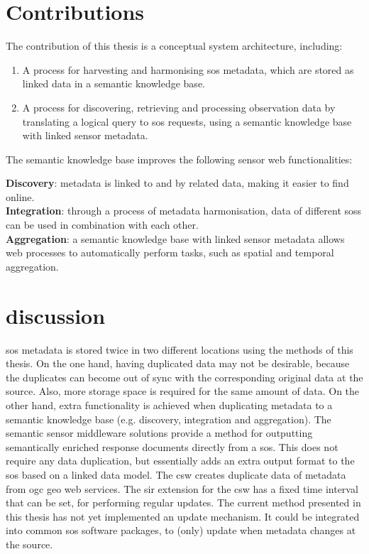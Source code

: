 \section{Contributions}
\label{contributions}

The contribution of this thesis is a conceptual system architecture, including:
\begin{enumerate}
	\item A process for harvesting and harmonising \ac{sos} metadata, which are stored as linked data in a semantic knowledge base.
	\item A process for discovering, retrieving and processing observation data by translating a logical query to \ac{sos} requests, using a semantic knowledge base with linked sensor metadata. 
\end{enumerate}

The semantic knowledge base improves the following sensor web functionalities:\\
\begin{addmargin}[0.5cm]{0cm}
	\textbf{Discovery}: metadata is linked to and by related data, making it easier to find online.\\
	\textbf{Integration}: through a process of metadata harmonisation, data of different \aclp{sos} can be used in combination with each other.  \\
	\textbf{Aggregation}: a semantic knowledge base with linked sensor metadata allows web processes to automatically perform tasks, such as spatial and temporal aggregation. 
\end{addmargin}


\section{discussion}

\ac{sos} metadata is stored twice in two different locations using the methods of this thesis. On the one hand, having duplicated data may not be desirable, because the duplicates can become out of sync with the corresponding original data at the source. Also, more storage space is required for the same amount of data. On the other hand, extra functionality is achieved when duplicating metadata to a semantic knowledge base (e.g. discovery, integration and aggregation). The semantic sensor middleware solutions provide a method for outputting semantically enriched response documents directly from a \ac{sos}. This does not require any data duplication, but essentially adds an extra output format to the \ac{sos} based on a linked data model. The \ac{csw} creates duplicate data of metadata from \ac{ogc} geo web services. The \acs{sir} extension for the \ac{csw} has a fixed time interval that can be set, for performing regular updates. The current method presented in this thesis has not yet implemented an update mechanism. It could be integrated into common \ac{sos} software packages, to (only) update when metadata changes at the source. 

